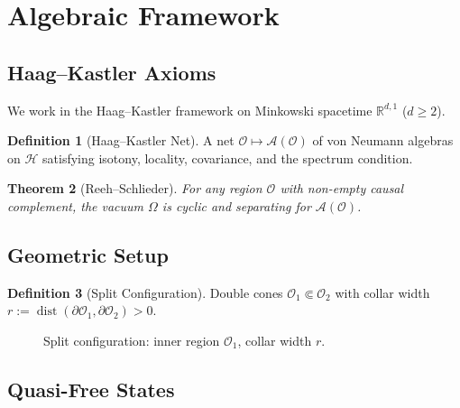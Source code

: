 \documentclass[11pt,a4paper]{article}
\theoremstyle{plain}
\newtheorem{theorem}{Theorem}[section]
\theoremstyle{definition}
\newtheorem{definition}[theorem]{Definition}
\theoremstyle{remark}
\newcommand{\Aa}{\mathcal{A}}
\newcommand{\Oo}{\mathcal{O}}
\newcommand{\Hh}{\mathcal{H}}
\newcommand{\R}{\mathbb{R}}
\newcommand{\dist}{\operatorname{dist}}
\begin{document}
\section{Algebraic Framework}\label{sec:framework}

\subsection{Haag--Kastler Axioms}

We work in the Haag--Kastler framework \cite{Haag96} on Minkowski spacetime
$\R^{d,1}$ ($d \ge 2$).

\begin{definition}[Haag--Kastler Net]
A net $\Oo \mapsto \Aa(\Oo)$ of von Neumann algebras on $\Hh$ satisfying isotony,
locality, covariance, and the spectrum condition.
\end{definition}

\begin{theorem}[Reeh--Schlieder]
For any region $\Oo$ with non-empty causal complement, the vacuum $\Omega$ is cyclic
and separating for $\Aa(\Oo)$.
\end{theorem}

\subsection{Geometric Setup}

\begin{definition}[Split Configuration]
Double cones $\Oo_1 \Subset \Oo_2$ with collar width
$r := \dist(\partial \Oo_1, \partial \Oo_2) > 0$.
\end{definition}

\begin{figure}[ht]
\centering
{}
\caption{Split configuration: inner region $\Oo_1$, collar width $r$.}
\end{figure}

\subsection{Quasi-Free States}
\end{document}
